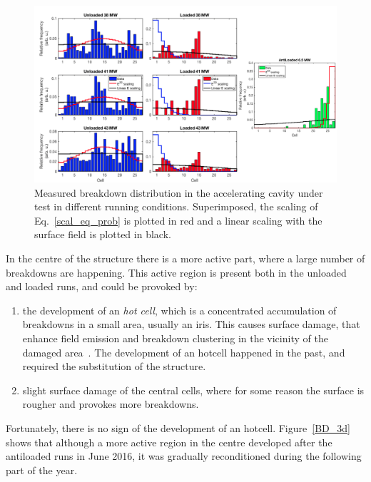 \begin{landscape}

\begin{figure}[p]
\centering 
\includegraphics[scale=0.53]{pictures/distro_all.png}
\caption{Measured breakdown distribution in the accelerating cavity under test in different running conditions. Superimposed, the scaling of Eq.~\ref{scal_eq_prob} is plotted in red and a linear scaling with the surface field is plotted in black.}
\label{BD_distro}
\end{figure}
 
\end{landscape}

In the centre of the structure there is a more active part, where a large number of breakdowns are happening. This active region is present both in the unloaded and loaded runs, and could be provoked by: 
\begin{enumerate}
\item the development of an \textit{hot cell}, which is a concentrated accumulation of breakdowns in a small area, usually an iris. This causes surface damage, that enhance field emission and breakdown clustering in the vicinity of the damaged area~\cite{Wang:2008ap}. The development of an hotcell happened in the past, and required the substitution of the structure.
\item slight surface damage of the central cells, where for some reason the surface is rougher and provokes more breakdowns. 
\end{enumerate}

Fortunately, there is no sign of the development of an hotcell. Figure~\ref{BD_3d} shows that although a more active region in the centre developed after the antiloaded runs in June 2016, it was gradually reconditioned during the following part of the year. 

